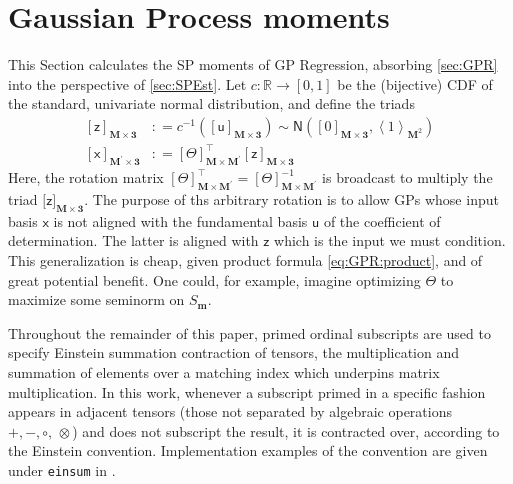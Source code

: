 \documentclass[preprint,12pt]{elsarticle}
\newcommand*{\M}[1]{\ensuremath{#1}\xspace}
\newcommand*{\x}{\times}
\newcommand*{\mi}[1]{\mathbf{#1}}
\newcommand*{\st}[1]{\mathbb{#1}}
\newcommand*{\rv}[1]{\mathsf{#1}}
\newcommand*{\te}[2][]{\left\lbrack{#2}\right\rbrack_{#1}}
\newcommand*{\tte}[2][]{\lbrack{#2}\rbrack_{#1}}
\newcommand*{\diag}[2][]{\left\langle{#2}\right\rangle_{#1}}
\newcommand*{\deq}{\M{\mathrel{\mathop:}=}}
\newcommand*{\gauss}[2]{\mathsf{N}\!\left({#1,#2}\right)}
\begin{document}
\section{Gaussian Process moments}\label{sec:GPMom}
    This Section calculates the SP moments of GP Regression, absorbing \cref{sec:GPR} into the perspective of \cref{sec:SPEst}.
    Let $c\colon \st{R} \to [0,1]$ be the (bijective) CDF of the standard, univariate normal distribution, and define the triads
    \begin{equation*}
        \begin{aligned}
            \te[\mi{M\x 3}]{\rv{z}} &\deq c^{-1}\!\left(\te[\mi{M\x 3}]
            {\rv{u}}\right) \sim \gauss{\te[\mi{M\x 3}]{0}}{\diag[\mi{M}^{2}]{1}} \\
            \te[\mi{M^{\prime}\x 3}]{\rv{x}} &\deq \te[\mi{M\x M^{\prime}}]{\Theta}^{\intercal} \te[\mi{M\x 3}]{\rv{z}}
        \end{aligned}
    \end{equation*}
    Here, the rotation matrix $\te[\mi{M\x M^{\prime}}]{\Theta}^{\intercal} = \te[\mi{M\x M^{\prime}}]{\Theta}^{-1}$ is broadcast to multiply the triad $\tte[\mi{M\x 3}]{\rv{z}}$. 
    The purpose of ths arbitrary rotation is to allow GPs whose input basis $\rv{x}$ is not aligned with the fundamental basis $\rv{u}$ of the coefficient of determination. The latter is aligned with $\rv{z}$ which is the input we must condition. This generalization is cheap, given product formula \cref{eq:GPR:product}, and of great potential benefit. One could, for example, imagine optimizing $\Theta$ to maximize some seminorm on $S_{\mi{m}}$.
    
    Throughout the remainder of this paper, primed ordinal subscripts are used to specify Einstein summation contraction of tensors, the multiplication and summation of elements over a matching index which underpins matrix multiplication. In this work, whenever a subscript primed in a specific fashion appears in adjacent tensors (those not separated by algebraic operations $+,-,\circ,\,\otimes$) and does not subscript the result, it is contracted over, according to the Einstein convention. Implementation examples of the convention are given under {\tt einsum} in \cite{Numpy2022}.
    
\end{document}
